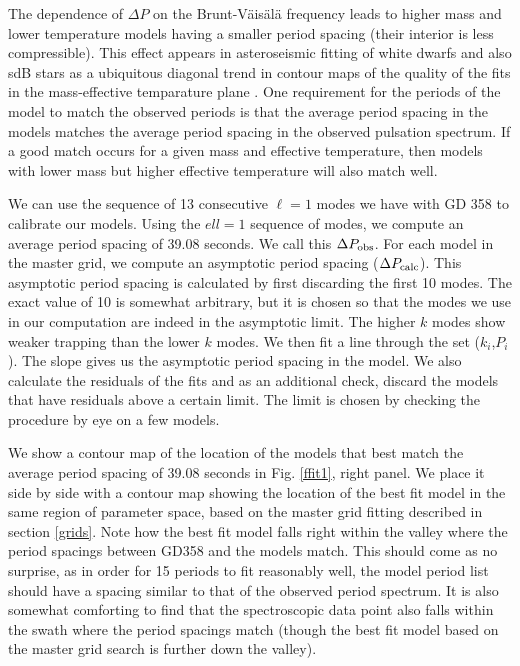 \documentclass[12pt,preprint]{aastex}
\newcommand{\bvf}{Brunt-V\"ais\"al\"a }
\begin{document}
The dependence of $\Delta P$ on the \bvf frequency leads to higher mass and lower temperature models 
having a smaller period spacing (their interior is less compressible). This effect appears in asteroseismic 
fitting of white dwarfs and also sdB stars as a ubiquitous diagonal trend in contour maps of the quality 
of the fits in the mass-effective temparature plane \citep[e.g][]{Bischoff-Kim14,Castanheira09,Charpinet08}. 
One requirement for the periods of the model to match the observed periods is that the average period spacing 
in the models matches the average period spacing in the observed pulsation spectrum. If a good match occurs 
for a given mass and effective temperature, then models with lower mass but higher effective temperature 
will also match well.

We can use the sequence of 13 consecutive $\ell=1$ modes we have with GD 358 to calibrate our models. 
Using the $ell=1$ sequence of modes, we compute an average period spacing of 39.08 seconds. We call 
this $\Delta P_{\rm obs}$. For each model in the master grid, we compute an asymptotic period spacing 
($\Delta P_{\rm calc}$). This asymptotic period spacing is calculated by first discarding the first 
10 modes. The exact value of 10 is somewhat arbitrary, but it is chosen so that the modes we use in 
our computation are indeed in the asymptotic limit. The higher $k$ modes show weaker trapping than the 
lower $k$ modes. We then fit a line through the set ($k_i$,$P_i$). The slope gives us the asymptotic 
period spacing in the model. We also calculate the residuals of the fits and as an additional check, 
discard the models that have residuals above a certain limit. The limit is chosen by checking the procedure 
by eye on a few models. 

We show a contour map of the location of the models that best match the average period spacing of 
39.08 seconds in Fig. \ref{ffit1}, right panel. We place it side by side with a contour map showing 
the location of the best fit model in the same region of parameter space, based on the master grid 
fitting described in section \ref{grids}. Note how the best fit model falls right within the valley 
where the period spacings between GD358 and the models match. This should come as no surprise, as in 
order for 15 periods to fit reasonably well, the model period list should have a spacing similar to 
that of the observed period spectrum. It is also somewhat comforting to find that the spectroscopic 
data point also falls within the swath where the period spacings match (though the best fit model 
based on the master grid search is further down the valley).
\end{document}
